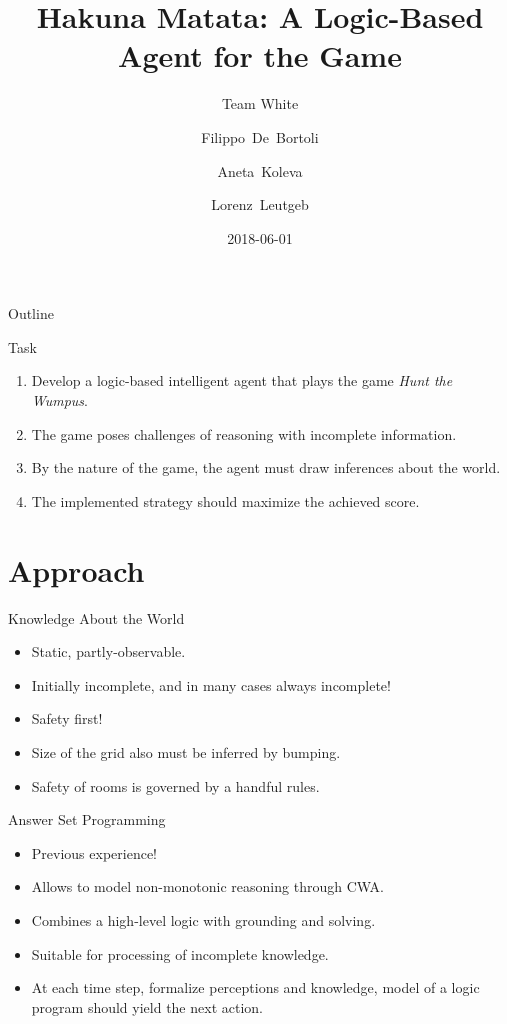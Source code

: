 \documentclass[smaller,dvipsnames,ratio=169,10pt]{beamer}
\title{Hakuna Matata: A Logic-Based Agent for the \htw Game}
\subtitle{Team White}
\author{Filippo~De~Bortoli \and Aneta~Koleva \and Lorenz~Leutgeb}
\institute{Free University of Bozen-Bolzano\\[2mm] \texttt{\{\href{mailto:filippo.debortoli@stud-inf.unibz.it}{filippo.debortoli},\href{mailto:aneta.koleva@stud-inf.unibz.it}{aneta.koleva},\href{mailto:lorenz.leutgeb@stud-inf.unibz.it}{lorenz.leutgeb}\}\newline @stud-inf.unibz.it}}
\date{2018-06-01}
\newcommand{\htw}{\emph{Hunt the Wumpus}\xspace}
\begin{document}
  \maketitle

  \begin{frame}{Outline}
    \tableofcontents
  \end{frame}

  \begin{frame}{Task}
    \begin{enumerate}
      \item Develop a logic-based intelligent \alert{agent} that plays the game {\htw}.
      \item The game poses challenges of reasoning with \alert{incomplete information}.
      \item By the nature of the game, the agent must \alert{draw inferences} about the world.
      \item The implemented strategy should \alert{maximize} the achieved \alert{score}.
    \end{enumerate}
  \end{frame}
  

  \section{Approach}
	 \begin{frame}{Knowledge About the World}
	  \begin{itemize}
		\item Static, partly-observable.
		\item Initially incomplete, and in many cases always incomplete!
		\item Safety first!
		\item Size of the grid also must be inferred by bumping. 
		\item Safety of rooms is governed by a handful rules.
	  \end{itemize}
	 \end{frame}

 \begin{frame}{Answer Set Programming}
	\begin{itemize}
		\item Previous experience!
		\item Allows to model non-monotonic reasoning through CWA. 
		\item Combines a high-level logic with grounding and solving.
		\item Suitable for processing of incomplete knowledge. 
		\item At each time step, formalize perceptions and knowledge, model of a logic program should yield the next action.
	\end{itemize}
 \end{frame}
\end{document}
